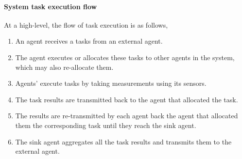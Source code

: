 \paragraph{System task execution flow}

At a high-level, the flow of task execution is as follows,
\begin{enumerate}
	\item An agent receives a tasks from an external agent.
	\item The agent executes or allocates these tasks to other agents in the system, which may also re-allocate them.
	\item Agents' execute tasks by taking measurements using its sensors.
	\item The task results are transmitted back to the agent that allocated the task.
	\item The results are re-transmitted by each agent back the agent that allocated them the corresponding task until they reach the sink agent.
	\item The sink agent aggregates all the task results and transmits them to the external agent.
\end{enumerate}



